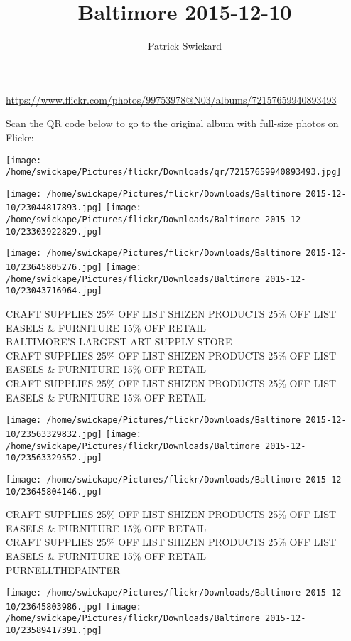 \documentclass[10pt,letterpaper]{article}
\title{Baltimore 2015-12-10}
\author{Patrick Swickard}
\date{}
\begin{document}
\maketitle

\url{https://www.flickr.com/photos/99753978@N03/albums/72157659940893493}

Scan the QR code below to go to the original album with full-size photos on Flickr:

\texttt{[image: /home/swickape/Pictures/flickr/Downloads/qr/72157659940893493.jpg]}
\pagebreak

\texttt{[image: /home/swickape/Pictures/flickr/Downloads/Baltimore 2015-12-10/23044817893.jpg]}
\texttt{[image: /home/swickape/Pictures/flickr/Downloads/Baltimore 2015-12-10/23303922829.jpg]}

\texttt{[image: /home/swickape/Pictures/flickr/Downloads/Baltimore 2015-12-10/23645805276.jpg]}
\texttt{[image: /home/swickape/Pictures/flickr/Downloads/Baltimore 2015-12-10/23043716964.jpg]}

CRAFT SUPPLIES 25\% OFF LIST SHIZEN PRODUCTS 25\% OFF LIST EASELS \& FURNITURE 15\% OFF RETAIL\\
BALTIMORE'S LARGEST ART SUPPLY STORE\\
CRAFT SUPPLIES 25\% OFF LIST SHIZEN PRODUCTS 25\% OFF LIST EASELS \& FURNITURE 15\% OFF RETAIL\\
CRAFT SUPPLIES 25\% OFF LIST SHIZEN PRODUCTS 25\% OFF LIST EASELS \& FURNITURE 15\% OFF RETAIL
\pagebreak

\texttt{[image: /home/swickape/Pictures/flickr/Downloads/Baltimore 2015-12-10/23563329832.jpg]}
\texttt{[image: /home/swickape/Pictures/flickr/Downloads/Baltimore 2015-12-10/23563329552.jpg]}

\vspace{0.25in}
\texttt{[image: /home/swickape/Pictures/flickr/Downloads/Baltimore 2015-12-10/23645804146.jpg]}

CRAFT SUPPLIES 25\% OFF LIST SHIZEN PRODUCTS 25\% OFF LIST EASELS \& FURNITURE 15\% OFF RETAIL\\
CRAFT SUPPLIES 25\% OFF LIST SHIZEN PRODUCTS 25\% OFF LIST EASELS \& FURNITURE 15\% OFF RETAIL\\
PURNELLTHEPAINTER
\pagebreak

\texttt{[image: /home/swickape/Pictures/flickr/Downloads/Baltimore 2015-12-10/23645803986.jpg]}
\texttt{[image: /home/swickape/Pictures/flickr/Downloads/Baltimore 2015-12-10/23589417391.jpg]}
\end{document}
